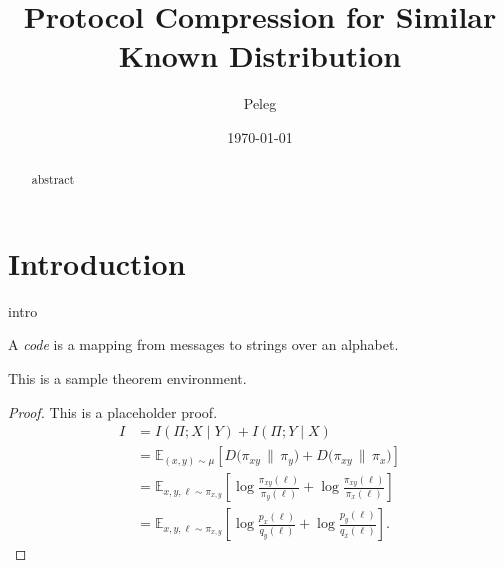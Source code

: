\documentclass[11pt]{article}
\title{Protocol Compression for Similar Known Distribution}
\author{Peleg}
\date{\today}
\begin{document}
\maketitle

\begin{abstract}
abstract 
\end{abstract}

\section{Introduction}
intro

\begin{definition}
A \emph{code} is a mapping from messages to strings over an alphabet.
\end{definition}

\begin{theorem}
This is a sample theorem environment.
\end{theorem}

\begin{proof}
This is a placeholder proof.
\begin{align*}
    I 
    &= I(\Pi; X \mid Y) + I(\Pi; Y \mid X) \\
    &= \mathbb{E}_{(x, y) \sim \mu} 
       \left[ D\big( \pi_{xy} \,\|\, \pi_y \big)
            + D\big( \pi_{xy} \,\|\, \pi_x \big) \right] \\
    &= \mathbb{E}_{x,y,\ell \sim \pi_{x,y}} 
       \left[
          \log \frac{\pi_{xy}(\ell)}{\pi_y(\ell)}
          + \log \frac{\pi_{xy}(\ell)}{\pi_x(\ell)}
       \right] \\
    &= \mathbb{E}_{x,y,\ell \sim \pi_{x,y}} 
       \left[
          \log \frac{p_x(\ell)}{q_y(\ell)}
          + \log \frac{p_y(\ell)}{q_x(\ell)}
       \right].
\end{align*}
\end{proof}



\end{document}
